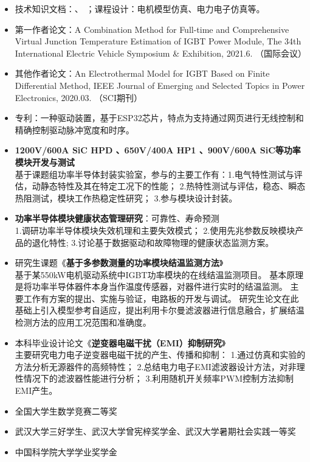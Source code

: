 \documentclass[zh]{resume}
\begin{document}
\begin{itemize}
  \item 技术知识文档：、
  ；课程设计：电机模型仿真、电力电子仿真等。
  \item 第一作者论文：{\small A Combination Method for Full-time and Comprehensive Virtual Junction Temperature Estimation of IGBT Power Module, The 34th International Electric Vehicle Symposium \& Exhibition, 2021.6. （国际会议）}
  \item 其他作者论文：{\small An Electrothermal Model for IGBT Based on Finite Differential Method, IEEE Journal of Emerging and Selected Topics in Power Electronics, 2020.03. 
  （SCI期刊） }
  \item 专利：一种驱动装置，基于ESP32芯片，特点为支持通过网页进行无线控制和精确控制驱动脉冲宽度和时序。
\end{itemize}

\begin{itemize}
  \item \textbf{1200V/600A SiC HPD 、650V/400A HP1 、900V/600A SiC等功率模块开发与测试}\\
  {\small 基于课题组功率半导体封装实验室，参与的主要工作有：1.电气特性测试与评估，动静态特性及其在特定工况下的性能；
  2.热特性测试与评估，稳态、瞬态热阻测试，模块工作热稳定性研究；
  3.参与模块设计封装。}
  \item \textbf{功率半导体模块健康状态管理研究}：可靠性、寿命预测\\ 
  {\small 1.调研功率半导体模块失效机理和主要失效模式；
  2.使用先兆参数反映模块产品的退化特性;
  3.讨论基于数据驱动和故障物理的健康状态监测方案。}
  \item 研究生课题《\textbf{基于多参数测量的功率模块结温监测方法}》\\
  {\small 基于某550kW电机驱动系统中IGBT功率模块的在线结温监测项目。
  基本原理是将功率半导体器件本身当作温度传感器，对器件进行实时的结温监测。
  主要工作有方案的提出、实施与验证，电路板的开发与调试。
  研究生论文在此基础上引入模型参考自适应，提出利用卡尔曼滤波器进行信息融合，扩展结温检测方法的应用工况范围和准确度。}
  \item 本科毕业设计论文《\textbf{逆变器电磁干扰（EMI）抑制研究}》\\ 
  {\small 主要研究电力电子逆变器电磁干扰的产生、传播和抑制：
  1.通过仿真和实验的方法分析无源器件的高频特性；
  2.总结电力电子EMI滤波器设计方法，对非理性情况下的滤波器性能进行分析；
  3.利用随机开关频率PWM控制方法抑制EMI产生。}
  
  
\end{itemize}

\begin{itemize}
  \item 全国大学生数学竞赛二等奖
  \item 武汉大学三好学生、武汉大学曾宪梓奖学金、武汉大学暑期社会实践一等奖
  \item 中国科学院大学学业奖学金
\end{itemize}
\end{document}
